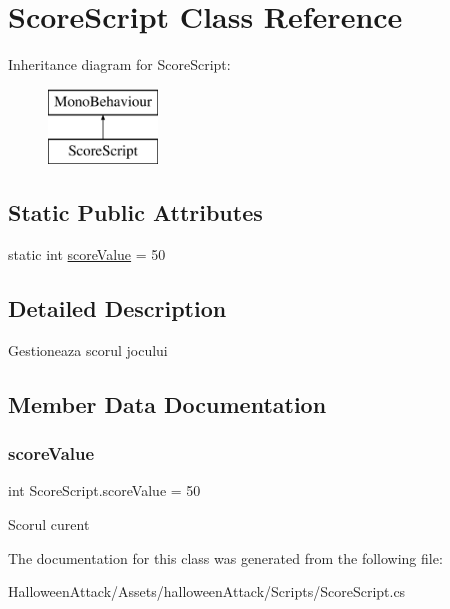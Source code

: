 \hypertarget{class_score_script}{}\section{Score\+Script Class Reference}
\label{class_score_script}
Inheritance diagram for Score\+Script\+:\begin{figure}[H]
\begin{center}
\leavevmode
\includegraphics[height=2.000000cm]{class_score_script}
\end{center}
\end{figure}
\subsection*{Static Public Attributes}
\begin{DoxyCompactItemize}
\item 
static int \hyperlink{class_score_script_a764663ff02a695ee377080f1fecc9296}{score\+Value} = 50
\end{DoxyCompactItemize}


\subsection{Detailed Description}
Gestioneaza scorul jocului 

\subsection{Member Data Documentation}
\mbox{\label{class_score_script_a764663ff02a695ee377080f1fecc9296}} 
\subsubsection{\texorpdfstring{score\+Value}{scoreValue}}
{\footnotesize\ttfamily int Score\+Script.\+score\+Value = 50\hspace{0.3cm}{\ttfamily [static]}}

Scorul curent 

The documentation for this class was generated from the following file\+:\begin{DoxyCompactItemize}
\item 
Halloween\+Attack/\+Assets/halloween\+Attack/\+Scripts/Score\+Script.\+cs\end{DoxyCompactItemize}
